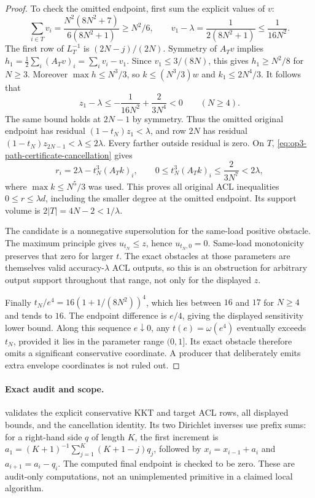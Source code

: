 \begin{proof}
To check the omitted endpoint, first sum the explicit values of $v$:
\[
 \sum_{i\in T}v_i
 =\frac{N^2(8N^2+7)}{6(8N^2+1)}\geq N^2/6,
 \qquad
 v_1-\lambda=\frac1{2(8N^2+1)}\leq\frac1{16N^2}.
\]
The first row of $L_T^{-1}$ is $(2N-j)/(2N)$.
Symmetry of $A_Tv$ implies
$h_1=\frac12\sum_i(A_Tv)_i=\sum_i v_i-v_1$.
Since $v_1\leq3/(8N)$, this gives $h_1\geq N^2/8$ for $N\geq3$.
Moreover $\max h\leq N^3/3$, so $k\leq(N^3/3)w$ and
$k_1\leq2N^4/3$. It follows that
\[
 z_1-\lambda
 \leq-\frac1{16N^2}+\frac2{3N^4}<0\qquad(N\geq4).
\]
The same bound holds at $2N-1$ by symmetry. Thus the omitted original
endpoint has residual $(1-t_N)z_1<\lambda$, and row $2N$ has residual
$(1-t_N)z_{2N-1}<\lambda\leq2\lambda$. Every farther outside residual
is zero. On $T$, \cref{eq:op3-path-certificate-cancellation} gives
\[
 r_i=2\lambda-t_N^3(A_Tk)_i,\qquad
 0\leq t_N^3(A_Tk)_i\leq\frac2{3N^7}<2\lambda,
\]
where $\max k\leq N^5/3$ was used. This proves all original ACL
inequalities $0\leq r\leq\lambda d$, including the smaller degree
at the omitted endpoint. Its support volume is $2|T|=4N-2<1/\lambda$.

The candidate is a nonnegative supersolution for the same-load positive
obstacle. The maximum principle gives $u_{t_N}\leq z$, hence
$u_{t_N,0}=0$. Same-load monotonicity preserves that zero for larger
$t$. The exact obstacles at those parameters are themselves valid
accuracy-$\lambda$ ACL outputs, so this is an obstruction for arbitrary
output support throughout that range, not only for the displayed $z$.

Finally $t_N/e^4=16(1+1/(8N^2))^4$, which lies between $16$ and $17$
for $N\geq4$ and tends to $16$. The endpoint difference is $e/4$,
giving the displayed sensitivity lower bound. Along this sequence
$e\downarrow0$, any $t(e)=\omega(e^4)$ eventually exceeds $t_N$,
provided it lies in the parameter range $(0,1]$. Its exact obstacle
therefore omits a significant conservative coordinate. A producer that
deliberately emits extra envelope coordinates is not ruled out.
\end{proof}

\paragraph{Exact audit and scope.}
 validates the explicit
conservative KKT and target ACL rows, all displayed bounds, and the
cancellation identity. Its two Dirichlet inverses use prefix sums:
for a right-hand side $q$ of length $K$, the first increment is
$a_1=(K+1)^{-1}\sum_{j=1}^K(K+1-j)q_j$, followed by
$x_i=x_{i-1}+a_i$ and $a_{i+1}=a_i-q_i$. The computed final endpoint
is checked to be zero. These are audit-only computations, not an
unimplemented primitive in a claimed local algorithm.

